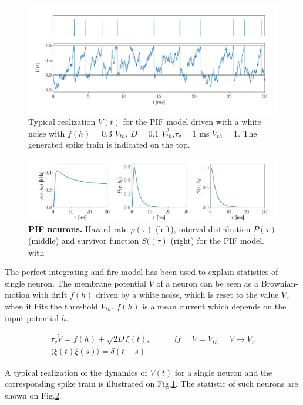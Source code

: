 \documentclass[12pt,twoside]{report}
\begin{document}
\begin{figure}[h!]
	\centering
	\includegraphics[width=0.8\linewidth]{PIF_V}
	\caption{Typical realization $V(t)$ for the PIF model driven with a white noise with $f(h)=0.3$ $V_{th}$, $D=0.1$ $V_{th}^2$,$\tau_v=1$ ms $V_{th}=1$. The generated spike train is indicated on the top.
	}
	\label{fig:PIFV}
\end{figure}


\begin{figure}[h!]
	
	\includegraphics[width=\linewidth]{inversegaussian.pdf}
	\caption{\textbf{PIF neurons.} Hazard rate $\rho(\tau)$ (left), interval distribution $P(\tau)$ (middle) and survivor function $S((\tau)$ (right) for the PIF model. with 
	}
	\label{fig:inversegaussianprocess}
\end{figure}

The perfect integrating-and fire model has been used to explain statistics of single neuron. The membrane potential $V$ of a neuron can be seen as a Brownian-motion with drift $f(h)$ driven by a white noise, which is reset to the value $V_r$ when it hits the threshold $V_{th}$. $f(h)$ is a mean current which depends on the input potential $h$.


\begin{align}
\label{eq:Vxi}
\tau_v\dot V=f(h) +\sqrt{2D}\xi(t), \:\:\:\:\:\:\:\: \:\:\:\:\: if\:\:\:\:\:\:  V=V_{th}\:\:\:\:\:\:V\rightarrow V_r\\ 
\langle\xi(t)\xi(s)\rangle=\delta(t-s)
\end{align}

A typical realization of the dynamics of $V(t)$ for a single neuron and the corresponding spike train is illustrated on Fig.\ref{fig:PIFV}. The statistic of such neurons are shown on Fig.\ref{fig:inversegaussianprocess}.
\end{document}
